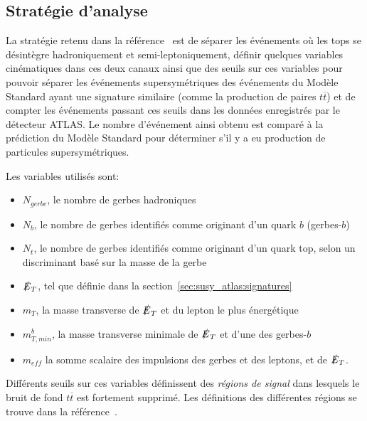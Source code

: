 \subsection{Stratégie d'analyse}
\label{sec:susy_atlas:gtt:strategie}

La stratégie retenu dans la référence~\cite{ATLAS-CONF-2015-067} est
de séparer les événements où les tops se désintègre hadroniquement et
semi-leptoniquement, définir quelques variables cinématiques dans ces
deux canaux ainsi que des seuils sur ces variables pour pouvoir
séparer les événements supersymétriques des événements du Modèle
Standard ayant une signature similaire (comme la production de paires
$t\overline{t}$) et de compter les événements passant ces seuils dans
les données enregistrés par le détecteur ATLAS. Le nombre d'événement
ainsi obtenu est comparé à la prédiction du Modèle
Standard pour déterminer s'il y a eu production de particules supersymétriques.

\noindent Les variables utilisés sont:

\begin{itemize}
\item $N_{gerbe}$, le nombre de gerbes hadroniques %
\item $N_b$, le nombre de gerbes identifiés comme originant d'un quark $b$ (gerbes-$b$)
\item $N_{t}$, le nombre de gerbes identifiés comme originant d'un
  quark top, selon un discriminant basé sur la masse de la gerbe
\item $\slashed{E}_T$, tel que définie dans la
  section~\ref{sec:susy_atlas:signatures}
\item $m_T$, la masse transverse de $\slashed{E}_T$ et du lepton le
  plus énergétique
\item $m_{T,min}^b$, la masse transverse minimale de $\slashed{E}_T$ et
  d'une des gerbes-$b$
\item $m_{eff}$ la somme scalaire des impulsions des gerbes et des leptons, et de $\slashed{E}_T$.
\end{itemize}

Différents seuils sur ces variables définissent des \emph{régions de
  signal} dans lesquels le bruit de fond $t\overline{t}$ est fortement
supprimé. Les définitions des différentes régions se trouve dans la
référence~\cite{ATLAS-CONF-2015-067}.


